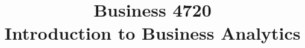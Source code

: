 \documentclass{article}
\title{Business 4720\\ \vspace{\baselineskip}
Introduction to Business Analytics}
\begin{document}
\maketitle

\vfill

\clearpage


\end{document}
